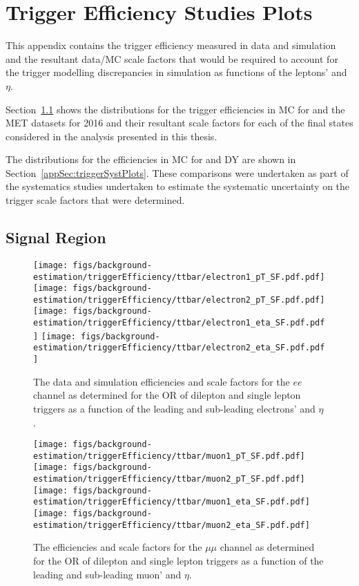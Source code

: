 \chapter{Trigger Efficiency Studies Plots}\label{app:triggerEff}
This appendix contains the trigger efficiency measured in data and simulation and the resultant data/MC scale factors that would be required to account for the trigger modelling discrepancies in simulation as functions of the leptons' \pT and $\eta$.

Section~\ref{appSec:triggerEffPlots} shows the distributions for the trigger efficiencies in MC for \ttbar and the MET datasets for 2016 and their resultant scale factors for each of the final states considered in the analysis presented in this thesis.

The distributions for the efficiencies in MC for \ttbar and DY are shown in Section~\ref{appSec:triggerSystPlots}. 
These comparisons were undertaken as part of the systematics studies undertaken to estimate the systematic uncertainty on the trigger scale factors that were determined.

\clearpage
\newpage

\section{Signal Region}\label{appSec:triggerEffPlots}

\begin{figure}[ht]
\centering
\texttt{[image: figs/background-estimation/triggerEfficiency/ttbar/electron1\_pT\_SF.pdf.pdf]}
\texttt{[image: figs/background-estimation/triggerEfficiency/ttbar/electron2\_pT\_SF.pdf.pdf]}
\\
\texttt{[image: figs/background-estimation/triggerEfficiency/ttbar/electron1\_eta\_SF.pdf.pdf]}
\texttt{[image: figs/background-estimation/triggerEfficiency/ttbar/electron2\_eta\_SF.pdf.pdf]}
\caption{
The data and \ttbar simulation efficiencies and scale factors for the $ee$ channel as determined for the OR of dilepton and single lepton triggers as a function of the leading and sub-leading electrons' \pT and $\eta$.
}
\label{fig:App_trigEff_ee}
\end{figure}

\begin{figure}[ht]
\centering
\texttt{[image: figs/background-estimation/triggerEfficiency/ttbar/muon1\_pT\_SF.pdf.pdf]}
\texttt{[image: figs/background-estimation/triggerEfficiency/ttbar/muon2\_pT\_SF.pdf.pdf]}
\\
\texttt{[image: figs/background-estimation/triggerEfficiency/ttbar/muon1\_eta\_SF.pdf.pdf]}
\texttt{[image: figs/background-estimation/triggerEfficiency/ttbar/muon2\_eta\_SF.pdf.pdf]}
\caption{
The efficiencies and scale factors for the $\mu\mu$ channel as determined for the OR of dilepton and single lepton triggers as a function of the leading and sub-leading muon' \pT and $\eta$.
}
\label{fig:App_trigEff_mumu}
\end{figure}

